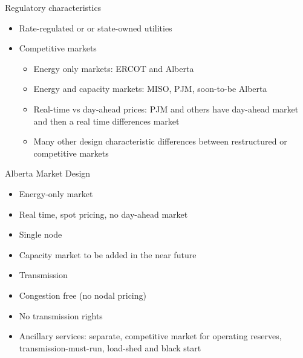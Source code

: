 \documentclass{beamer}
\renewcommand{\(}{\begin{columns}}
\renewcommand{\)}{\end{columns}}
\newcommand{\<}[1]{\begin{column}{#1}}
\renewcommand{\>}{\end{column}}
\begin{document}
\begin{frame}{Regulatory characteristics}
\begin{itemize}
\setlength\itemsep{.25em}
\item Rate-regulated or or state-owned utilities
\item Competitive markets
\begin{itemize}
\setlength\itemsep{.15em}
\item Energy only markets: ERCOT and Alberta
\item Energy and capacity markets: MISO, PJM, soon-to-be Alberta
\item Real-time vs day-ahead prices: PJM and others have day-ahead market and then a real time differences market
\item Many other design characteristic differences between restructured or competitive markets
\end{itemize}
\end{itemize}

\vfill
\end{frame}


\begin{frame}{Alberta Market Design}
\begin{itemize}
\setlength\itemsep{.25em}
\item Energy-only market
\item Real time, spot pricing, no day-ahead market
\item Single node
\item Capacity market to be added in the near future
\item Transmission
\item Congestion free (no nodal pricing)
\item No transmission rights
\item Ancillary services: separate, competitive market for operating reserves, transmission-must-run, load-shed and black start
\end{itemize}

\vfill
\end{frame}
\end{document}

